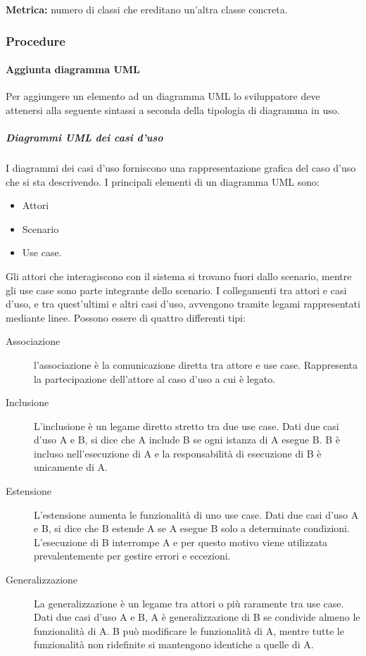 \documentclass[../../norme-di-progetto.tex]{subfiles}
\begin{document}
\textbf{Metrica:} numero di classi che ereditano un'altra classe concreta.


\subsubsection{Procedure}%
\label{subs:procedure}

\paragraph{Aggiunta diagramma UML}%
\label{par:aggiunta_uml}
Per aggiungere un elemento ad un diagramma UML lo sviluppatore deve attenersi alla seguente sintassi a seconda della tipologia di diagramma in uso.
\subparagraph{Diagrammi UML dei casi d'uso}%
\label{subp:diagrammi_UML_dei_casi_d'uso}
I diagrammi dei casi d'uso forniscono una rappresentazione grafica del caso d'uso che si sta descrivendo. I principali elementi di un diagramma UML sono:
\begin{itemize}
  \item Attori
  \item Scenario
  \item Use case.
\end{itemize}
Gli attori che interagiscono con il sistema si trovano fuori dallo scenario, mentre gli use case sono parte integrante dello scenario.
I collegamenti tra attori e casi d'uso, e tra quest'ultimi e altri casi d'uso, avvengono tramite legami rappresentati mediante linee.
Possono essere di quattro differenti tipi:
\begin{description}
  \item [Associazione] l'associazione è la comunicazione diretta tra attore e use case. Rappresenta la partecipazione dell'attore al caso d'uso a cui è legato.
  \item [Inclusione] L'inclusione è un legame diretto stretto tra due use case. Dati due casi d'uso A e B, si dice che A include B se ogni istanza di A esegue B. B è incluso nell'esecuzione di A e la responsabilità di esecuzione di B è unicamente di A.
  \item [Estensione] L'estensione aumenta le funzionalità di uno use case. Dati due casi d'uso A e B, si dice che B estende A se A esegue B solo a determinate condizioni. L'esecuzione di B interrompe A e per questo motivo viene utilizzata prevalentemente per gestire errori e eccezioni.
  \item [Generalizzazione] La generalizzazione è un legame tra attori o più raramente tra use case. Dati due casi d'uso A e B, A è generalizzazione di B se condivide almeno le funzionalità di A. B può modificare le funzionalità di A, mentre tutte le funzionalità non ridefinite si mantengono identiche a quelle di A.
\end{description}
\end{document}
